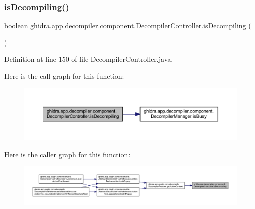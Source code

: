 \subsubsection{\texorpdfstring{isDecompiling()}{isDecompiling()}}
{\footnotesize\ttfamily boolean ghidra.\+app.\+decompiler.\+component.\+Decompiler\+Controller.\+is\+Decompiling (\begin{DoxyParamCaption}{ }\end{DoxyParamCaption})\hspace{0.3cm}{\ttfamily [inline]}}



Definition at line 150 of file Decompiler\+Controller.\+java.

Here is the call graph for this function\+:
\nopagebreak
\begin{figure}[H]
\begin{center}
\leavevmode
\includegraphics[width=350pt]{classghidra_1_1app_1_1decompiler_1_1component_1_1_decompiler_controller_a32d5c19b45f461f61f98f076ac043c63_cgraph}
\end{center}
\end{figure}
Here is the caller graph for this function\+:
\nopagebreak
\begin{figure}[H]
\begin{center}
\leavevmode
\includegraphics[width=350pt]{classghidra_1_1app_1_1decompiler_1_1component_1_1_decompiler_controller_a32d5c19b45f461f61f98f076ac043c63_icgraph}
\end{center}
\end{figure}
\mbox{\label{classghidra_1_1app_1_1decompiler_1_1component_1_1_decompiler_controller_a54c7bffb7bb2a181553cc3679315df7e}} 
